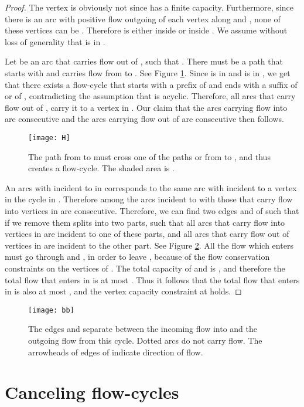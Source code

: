\documentclass[a4paper,11pt]{article}
\begin{document}
\begin{proof}
The vertex  is obviously not  since  has a finite capacity.
Furthermore, since there is an arc with positive flow outgoing of
each vertex along  and , none of these vertices can be . Therefore  is
either inside  or inside . We assume without loss of generality that
 is in .

 Let  be an arc that carries flow out of , such that . There must be a path  that starts with  and carries flow
from  to . See Figure \ref{fig:H}. Since  is in  and
 is in , we get that there exists a flow-cycle that starts
with a prefix of  and ends with a suffix of  or of ,
contradicting  the assumption that  is acyclic. Therefore,
all arcs that carry flow out of , carry it to a vertex in .
Our claim that the arcs carrying flow into
 are consecutive and the arcs carrying flow out of  are
consecutive then follows.

\begin{figure}
    \centering
    \texttt{[image: H]}
    \caption{The path  from  to  must cross one of the paths  or  from  to , and thus creates a flow-cycle. The shaded area is .}
    \label{fig:H}
\end{figure}

An arcs  with  incident to  in  corresponds to the same
arc  with  incident to a vertex in the cycle  in
. Therefore among the arcs incident to  with  those
that carry flow into vertices in  are consecutive.
 Therefore,
we can find two edges  and  of  such that if we remove
them  splits into two parts, such that all arcs that carry flow
into vertices in  are incident to one of these parts, and all
arcs that carry flow out of vertices in  are incident to the
other part.
 See
Figure \ref{fig:bb}. All the flow which enters  must go through
 and , in order to leave , because of the flow conservation
constraints on the vertices of .
The total capacity of  and  is ,
and therefore the total flow that enters  in  is at most
. Thus it follows that the total flow that enters  in
 is also at most , and the vertex capacity constraint
at  holds.
\end{proof}

\begin{figure}
    \centering
    \texttt{[image: bb]}
    \caption{The edges  and  separate between the incoming flow into  and the outgoing flow from this cycle. Dotted arcs do not carry flow. The arrowheads of edges of  indicate direction of flow.}
    \label{fig:bb}
\end{figure}

\section{Canceling flow-cycles} \label{sec:canc}
\end{document}
